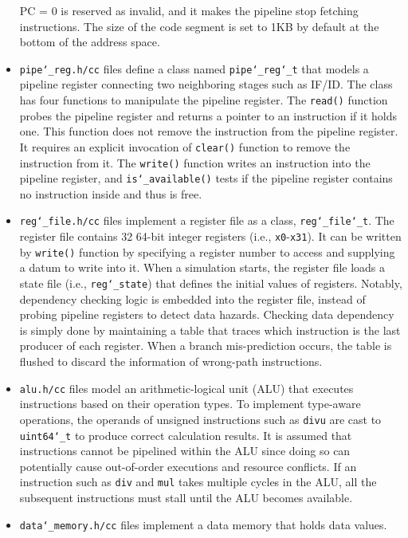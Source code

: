\documentclass[10pt]{article}
\begin{document}
\begin{itemize}
    PC = 0 is reserved as invalid, and it makes the pipeline stop fetching instructions.
    The size of the code segment is set to 1KB by default at the bottom of the address space.
\item
    {\tt pipe\char`_reg.h/cc} files define a class named {\tt pipe\char`_reg\char`_t} that models a pipeline register connecting two neighboring stages such as IF/ID.
    The class has four functions to manipulate the pipeline register.
    The {\tt read()} function probes the pipeline register and returns a pointer to an instruction if it holds one.
    This function does not remove the instruction from the pipeline register.
    It requires an explicit invocation of {\tt clear()} function to remove the instruction from it.
    The {\tt write()} function writes an instruction into the pipeline register, and {\tt is\char`_available()} tests if the pipeline register contains no instruction inside and thus is free.
\item{\tt reg\char`_file.h/cc} files implement a register file as a class, {\tt reg\char`_file\char`_t}.
    The register file contains 32 64-bit integer registers (i.e., {\tt x0}-{\tt x31}).
    It can be written by {\tt write()} function by specifying a register number to access and supplying a datum to write into it.
    When a simulation starts, the register file loads a state file (i.e., {\tt reg\char`_state}) that defines the initial values of registers.
    Notably, dependency checking logic is embedded into the register file, instead of probing pipeline registers to detect data hazards.
    Checking data dependency is simply done by maintaining a table that traces which instruction is the last producer of each register.
    When a branch mis-prediction occurs, the table is flushed to discard the information of wrong-path instructions.
\item
    {\tt alu.h/cc} files model an arithmetic-logical unit (ALU) that executes instructions based on their operation types.
    To implement type-aware operations, the operands of unsigned instructions such as {\tt divu} are cast to {\tt uint64\char`_t} to produce correct calculation results.
    It is assumed that instructions cannot be pipelined within the ALU since doing so can potentially cause out-of-order executions and resource conflicts.
    If an instruction such as {\tt div} and {\tt mul} takes multiple cycles in the ALU, all the subsequent instructions must stall until the ALU becomes available.
\item
    {\tt data\char`_memory.h/cc} files implement a data memory that holds data values.

\end{itemize}
\end{document}
